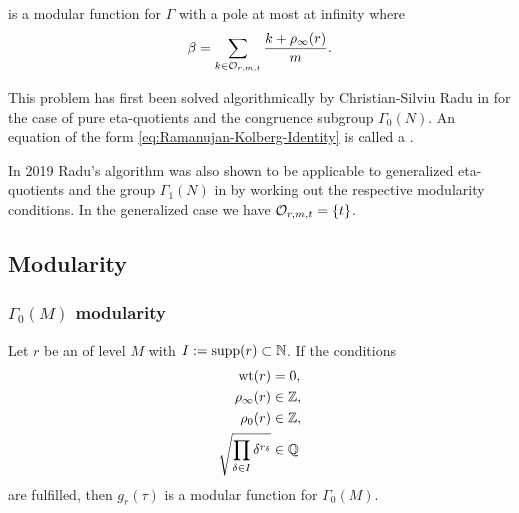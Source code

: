 \documentclass{article}
\begin{document}
is a modular function for $\Gamma$ with a pole at most at infinity where
\begin{gather}
  \beta = \sum_{k\in\mathcal{O}_{r,m,t}} \frac{k + \rho_\infty(r)}{m}.
  \label{eq:beta}
\end{gather}

This problem has first been solved algorithmically by Christian-Silviu
Radu in \cite{Radu_RamanujanKolberg_2015} for the case of pure
eta-quotients and the congruence subgroup $\Gamma_0(N)$.
%
An equation of the form \eqref{eq:Ramanujan-Kolberg-Identity} is
called a .

In 2019 Radu's algorithm was also shown to be applicable to generalized
eta-quotients and the group $\Gamma_1(N)$ in
\cite{ChenDuZhao_FindingModularFunctionsRamanujan_2019} by working out
the respective modularity conditions.
%
In the generalized case we have $\mathcal{O}_{r,m,t}=\left\{t\right\}$.



\subsection{Modularity}

\subsubsection{$\Gamma_0(M)$ modularity}

\begin{Lemma}\cite[Thm. 1.64]{Ono_WebOfModularity_2004}
  \label{thm:modular-eta-quotient-gamma0}
  Let $r$ be an  of level $M$
  with $I := \operatorname{supp}(r) \subset \mathbb{N}$. If the conditions
  \begin{align}
    \operatorname{wt}(r) &= 0, \label{eq:sum=0}\\
    \rho_\infty(r) &\in \mathbb{Z}, \label{eq:pure-rhoinfinity}\\
    \rho_0(r) &\in \mathbb{Z}, \label{eq:pure-rho0}\\
    \sqrt{\prod_{\delta\in I}\delta^{r_\delta}}&\in\mathbb{Q}\label{eq:productsquare}
  \end{align}
  are fulfilled, then $g_r(\tau)$ is a modular function for
  $\Gamma_0(M)$.
\end{Lemma}
\end{document}
